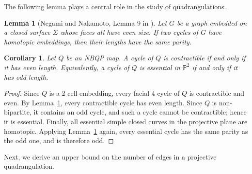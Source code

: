 \documentclass[10pt,a4paper]{article}
\newtheorem{corollary}[theorem]{Corollary}
\newtheorem{lemma}[theorem]{Lemma}
\begin{document}
The following lemma plays a central role in the study of quadrangulations.

\begin{lemma}[Negami and Nakamoto, Lemma 9 in \cite{NEG93}]\label{lem:cyclepar} Let $G$ be a graph embedded on a closed surface $\Sigma$ whose faces all have even size. If two cycles of $G$ have homotopic embeddings, then their lengths have the same parity.
\end{lemma}


\begin{corollary}\label{cor:nbqp-parity}
Let $Q$ be an NBQP map. A cycle of $Q$ is contractible if and only if it has even length. Equivalently, a cycle of $Q$ is essential in $\mathbb P^2$ if and only if it has odd length.
\end{corollary}
\begin{proof}
Since $Q$ is a 2-cell embedding, every facial $4$-cycle of $Q$ is contractible and even. By Lemma~\ref{lem:cyclepar}, every contractible cycle has even length. Since $Q$ is non-bipartite, it contains an odd cycle, and such a cycle cannot be contractible; hence it is essential. Finally, all essential simple closed curves in the projective plane are homotopic. Applying Lemma~\ref{lem:cyclepar} again, every essential cycle has the same parity as the odd one, and is therefore odd.
\end{proof}


Next, we derive an upper bound on the number of edges in a projective quadrangulation.
\end{document}
